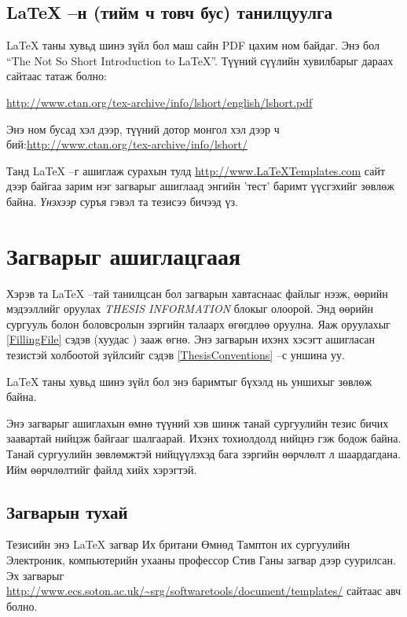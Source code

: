 \subsection{\LaTeX{} --н (тийм ч товч бус) танилцуулга}

{\LaTeX{}} таны хувьд шинэ зүйл бол маш сайн PDF цахим ном байдаг. Энэ бол \enquote{The Not So Short Introduction to \LaTeX{}}. Түүний сүүлийн хувилбарыг дараах сайтаас татаж болно:

{\url{http://www.ctan.org/tex-archive/info/lshort/english/lshort.pdf}}

Энэ ном бусад хэл дээр, түүний дотор монгол хэл дээр ч бий:\url{http://www.ctan.org/tex-archive/info/lshort/}

Танд \LaTeX{} --г ашиглаж сурахын тулд \url{http://www.LaTeXTemplates.com} сайт дээр байгаа зарим нэг загварыг ашиглаад энгийн 'тест' баримт үүсгэхийг зөвлөж байна. \emph{Үнэхээр} суръя гэвэл та тезисээ бичээд үз.


\section{Загварыг ашиглацгаая}

Хэрэв та \LaTeX{} --тай танилцсан бол загварын хавтаснаас  файлыг нээж, өөрийн мэдээллийг оруулах \emph{THESIS INFORMATION} блокыг олоорой. Энд өөрийн сургууль болон боловсролын зэргийн талаарх өгөгдлөө оруулна. Яаж оруулахыг \ref{FillingFile} сэдэв (хуудас \pageref{FillingFile}) зааж өгнө. Энэ загварын ихэнх хэсэгт ашигласан тезистэй холбоотой зүйлсийг сэдэв \ref{ThesisConventions} --с уншина уу.

\LaTeX{} таны хувьд шинэ зүйл бол энэ баримтыг бүхэлд нь уншихыг зөвлөж байна.

Энэ загварыг ашиглахын өмнө түүний хэв шинж танай сургуулийн тезис бичих заавартай нийцэж байгааг шалгаарай. Ихэнх тохиолдолд нийцнэ гэж бодож байна. Танай сургуулийн зөвлөмжтэй нийцүүлэхэд бага зэргийн өөрчлөлт л шаардагдана. Ийм өөрчлөлтийг  файлд хийх хэрэгтэй.

\subsection{Загварын тухай}

Тезисийн энэ \LaTeX{} загвар Их британи Өмнөд Тамптон их сургуулийн Электроник, компьютерийн ухааны профессор Стив Ганы загвар дээр суурилсан. Эх загварыг 
\url{http://www.ecs.soton.ac.uk/~srg/softwaretools/document/templates/} сайтаас авч болно.

